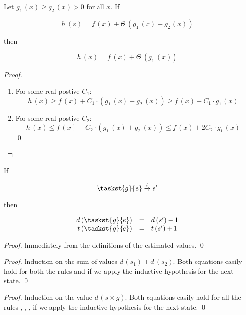 \begin{lemma}
\label{lem:theta_absorb}
Let $g_1\,(x) \ge g_2\,(x) > 0$ for all $x$. If

\[ h\,(x) = f\,(x) + \Theta\,(g_1\,(x) + g_2\,(x)) \]

then

\[ h\,(x) = f\,(x) + \Theta\,(g_1\,(x)) \]

\end{lemma}
\begin{proof}
\begin{enumerate}
\item For some real  postive $C_1$: \[ h\,(x) \ge f\,(x) + C_1 \cdot (g_1\,(x) + g_2\,(x)) \ge f\,(x) + C_1 \cdot g_1\,(x) \]
\item For some real  postive $C_2$: \[ h\,(x) \le f\,(x) + C_2 \cdot (g_1\,(x) + g_2\,(x)) \le f\,(x) + 2 C_2 \cdot g_1\,(x) \]
\qed
\end{enumerate}
\end{proof}

\begin{lemma}
\label{lem:task_measure_equations}
  If

  \[\taskst{g}{e} \xrightarrow{l} s^\prime\]

  then

  \[
    \begin{array}{rcl}
    d\,(\taskst{g}{e}) &=& d\,(s^\prime) + 1\\
    t\,(\taskst{g}{e}) &=& t\,(s^\prime) + 1
    \end{array}
  \]
\end{lemma}
\begin{proof}
    Immediately from the definitions of the estimated values.
    \qed
\end{proof}


\begin{proof}
Induction on the sum of values $d\,(s_1) + d\,(s_2)$. Both equations easily hold for both the rules  and  if we apply
the inductive hypothesis for the next state.
\qed
\end{proof}

\begin{proof}
Induction on the value $d\,(s \times g)$. Both equations easily hold for all the rules , , , 
if we apply the inductive hypothesis for the next state.
\qed
\end{proof}

